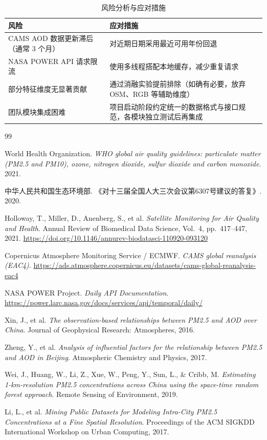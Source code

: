 \documentclass[UTF8,zihao=-4,a4paper]{ctexart}
\newcommand{\aodd}{AOD}
\begin{document}
\begin{table}[H]
  \centering
  \caption{风险分析与应对措施}
  \begin{tabularx}{\textwidth}{lX}
    \toprule
    风险 & 应对措施 \\
    \midrule
    CAMS \aodd{} 数据更新滞后（通常 3 个月） & 对近期日期采用最近可用年份回退 \\
    NASA POWER API 请求限流 & 使用多线程搭配本地缓存，减少重复请求 \\
    部分特征维度无显著贡献 & 通过消融实验提前排除（如确有必要，放弃 OSM、RGB 等辅助维度） \\
    团队模块集成困难 & 项目启动阶段约定统一的数据格式与接口规范，各模块独立测试后再集成 \\
    \bottomrule
  \end{tabularx}
\end{table}

\begin{thebibliography}{99}

World Health Organization. \textit{WHO global air quality guidelines: particulate matter (PM2.5 and PM10), ozone, nitrogen dioxide, sulfur dioxide and carbon monoxide}. 2021.

中华人民共和国生态环境部. 《对十三届全国人大三次会议第6307号建议的答复》. 2020.

Holloway, T., Miller, D., Anenberg, S., et al. \textit{Satellite Monitoring for Air Quality and Health}. Annual Review of Biomedical Data Science, Vol.\ 4, pp.\ 417--447, 2021. \url{https://doi.org/10.1146/annurev-biodatasci-110920-093120}

Copernicus Atmosphere Monitoring Service / ECMWF. \textit{CAMS global reanalysis (EAC4)}. \url{https://ads.atmosphere.copernicus.eu/datasets/cams-global-reanalysis-eac4}

NASA POWER Project. \textit{Daily API Documentation}. \url{https://power.larc.nasa.gov/docs/services/api/temporal/daily/}

Xin, J., et al. \textit{The observation-based relationships between PM2.5 and AOD over China}. Journal of Geophysical Research: Atmospheres, 2016.

Zheng, Y., et al. \textit{Analysis of influential factors for the relationship between PM2.5 and AOD in Beijing}. Atmospheric Chemistry and Physics, 2017.

Wei, J., Huang, W., Li, Z., Xue, W., Peng, Y., Sun, L., \& Cribb, M. \textit{Estimating 1-km-resolution PM2.5 concentrations across China using the space-time random forest approach}. Remote Sensing of Environment, 2019.

Li, L., et al. \textit{Mining Public Datasets for Modeling Intra-City PM2.5 Concentrations at a Fine Spatial Resolution}. Proceedings of the ACM SIGKDD International Workshop on Urban Computing, 2017.

\end{thebibliography}
\end{document}
